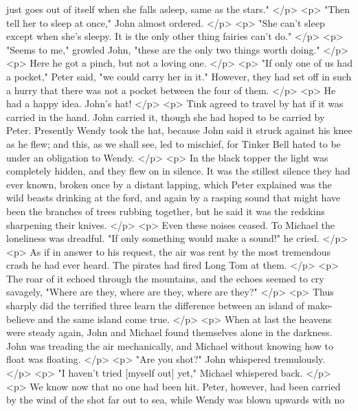       just goes out of itself when she falls asleep, same as the stars."
    </p>
    <p>
      "Then tell her to sleep at once," John almost ordered.
    </p>
    <p>
      "She can't sleep except when she's sleepy. It is the only other thing
      fairies can't do."
    </p>
    <p>
      "Seems to me," growled John, "these are the only two things worth doing."
    </p>
    <p>
      Here he got a pinch, but not a loving one.
    </p>
    <p>
      "If only one of us had a pocket," Peter said, "we could carry her in it."
      However, they had set off in such a hurry that there was not a pocket
      between the four of them.
    </p>
    <p>
      He had a happy idea. John's hat!
    </p>
    <p>
      Tink agreed to travel by hat if it was carried in the hand. John carried
      it, though she had hoped to be carried by Peter. Presently Wendy took the
      hat, because John said it struck against his knee as he flew; and this, as
      we shall see, led to mischief, for Tinker Bell hated to be under an
      obligation to Wendy.
    </p>
    <p>
      In the black topper the light was completely hidden, and they flew on in
      silence. It was the stillest silence they had ever known, broken once by a
      distant lapping, which Peter explained was the wild beasts drinking at the
      ford, and again by a rasping sound that might have been the branches of
      trees rubbing together, but he said it was the redskins sharpening their
      knives.
    </p>
    <p>
      Even these noises ceased. To Michael the loneliness was dreadful. "If only
      something would make a sound!" he cried.
    </p>
    <p>
      As if in answer to his request, the air was rent by the most tremendous
      crash he had ever heard. The pirates had fired Long Tom at them.
    </p>
    <p>
      The roar of it echoed through the mountains, and the echoes seemed to cry
      savagely, "Where are they, where are they, where are they?"
    </p>
    <p>
      Thus sharply did the terrified three learn the difference between an
      island of make-believe and the same island come true.
    </p>
    <p>
      When at last the heavens were steady again, John and Michael found
      themselves alone in the darkness. John was treading the air mechanically,
      and Michael without knowing how to float was floating.
    </p>
    <p>
      "Are you shot?" John whispered tremulously.
    </p>
    <p>
      "I haven't tried [myself out] yet," Michael whispered back.
    </p>
    <p>
      We know now that no one had been hit. Peter, however, had been carried by
      the wind of the shot far out to sea, while Wendy was blown upwards with no
